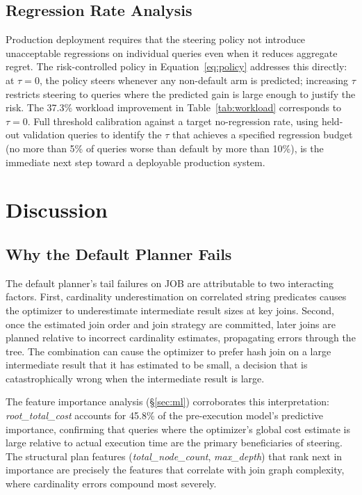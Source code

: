 \documentclass[sigconf,natbib=false]{article}
\newcommand{\feat}[1]{\textit{#1}}
\newcommand{\threshold}{\tau}
\begin{document}
\subsection{Regression Rate Analysis}

Production deployment requires that the steering policy not introduce unacceptable
regressions on individual queries even when it reduces aggregate regret. The risk-controlled
policy in Equation~\ref{eq:policy} addresses this directly: at $\threshold = 0$, the policy
steers whenever any non-default arm is predicted; increasing $\threshold$ restricts steering
to queries where the predicted gain is large enough to justify the risk. The 37.3\%
workload improvement in Table~\ref{tab:workload} corresponds to $\threshold = 0$.
Full threshold calibration against a target no-regression rate, using held-out validation
queries to identify the $\threshold$ that achieves a specified regression budget (no more
than 5\% of queries worse than default by more than 10\%), is the immediate next step
toward a deployable production system.


\section{Discussion}
\label{sec:discussion}

\subsection{Why the Default Planner Fails}

The default planner's tail failures on JOB are attributable to two interacting factors.
First, cardinality underestimation on correlated string predicates causes the optimizer to
underestimate intermediate result sizes at key joins. Second, once the estimated join order
and join strategy are committed, later joins are planned relative to incorrect cardinality
estimates, propagating errors through the tree. The combination can cause the optimizer to
prefer hash join on a large intermediate result that it has estimated to be small, a decision
that is catastrophically wrong when the intermediate result is large.

The feature importance analysis (\S\ref{sec:ml}) corroborates this interpretation:
\feat{root\_total\_cost} accounts for 45.8\% of the pre-execution model's predictive
importance, confirming that queries where the optimizer's global cost estimate is large
relative to actual execution time are the primary beneficiaries of steering. The structural
plan features (\feat{total\_node\_count}, \feat{max\_depth}) that rank next in importance
are precisely the features that correlate with join graph complexity, where cardinality
errors compound most severely.
\end{document}
